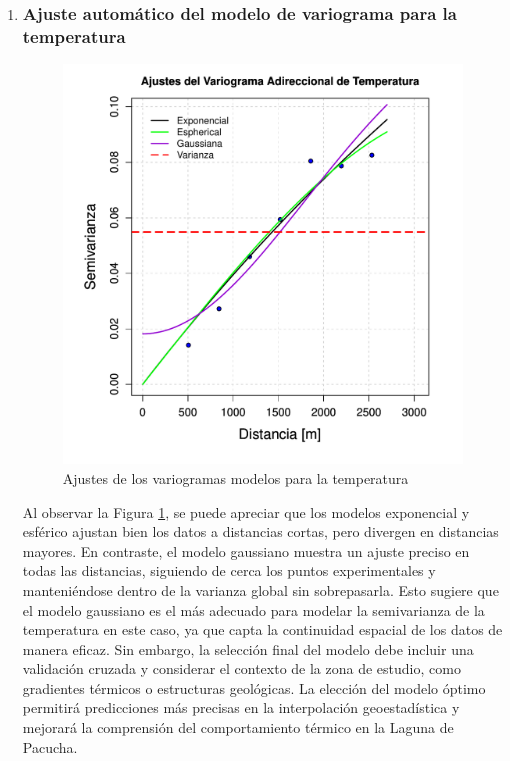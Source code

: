 \begin{enumerate}
 \item \subsubsection{Ajuste automático del modelo de variograma para la temperatura}

\begin{figure}[H]
    \centering
    \includegraphics[width=0.8\linewidth]{Figuras_AED//VARIOGRAFICO/tem_VarioAllModelEstimation.pdf}
    \caption{Ajustes de los variogramas modelos para la temperatura}
    \label{fig:enter-labelmodel}
\end{figure}

 Al observar la Figura \ref{fig:enter-labelmodel}, se puede apreciar que los modelos exponencial y esférico ajustan bien los datos a distancias cortas, pero divergen en distancias mayores. En contraste, el modelo gaussiano muestra un ajuste preciso en todas las distancias, siguiendo de cerca los puntos experimentales y manteniéndose dentro de la varianza global sin sobrepasarla. Esto sugiere que el modelo gaussiano es el más adecuado para modelar la semivarianza de la temperatura en este caso, ya que capta la continuidad espacial de los datos de manera eficaz. Sin embargo, la selección final del modelo debe incluir una validación cruzada y considerar el contexto de la zona de estudio, como gradientes térmicos o estructuras geológicas. La elección del modelo óptimo permitirá predicciones más precisas en la interpolación geoestadística y mejorará la comprensión del comportamiento térmico en la Laguna de Pacucha.


\end{enumerate}
